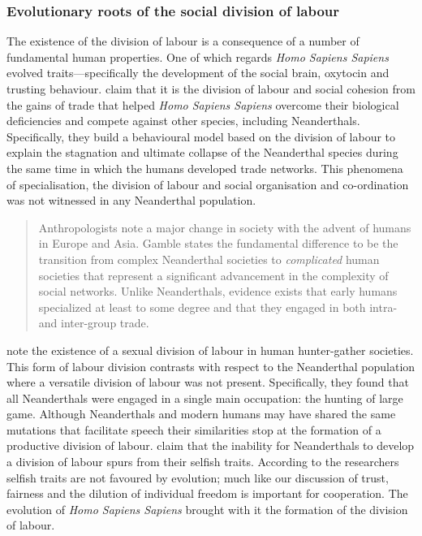 \subsubsection{Evolutionary roots of the social division of labour}

The existence of the division of labour is a consequence of a number of fundamental human properties. One of which regards \emph{Homo Sapiens Sapiens} evolved traits---specifically the development of the social brain, oxytocin and trusting behaviour. \citet{Horan2005} claim that it is the division of labour and social cohesion from the gains of trade that helped \emph{Homo Sapiens Sapiens} overcome their biological deficiencies and compete against other species, including Neanderthals. Specifically, they build a behavioural model based on the division of labour to explain the stagnation and ultimate collapse of the Neanderthal species during the same time in which the humans developed trade networks. This phenomena of specialisation, the division of labour and social organisation and co-ordination was not witnessed in any Neanderthal population.

\begin{quote}
Anthropologists note a major change in society with the advent of humans in Europe and Asia. Gamble states the fundamental difference to be the transition from complex Neanderthal societies to \emph{complicated} human societies that represent a significant advancement in the complexity of social networks. Unlike Neanderthals, evidence exists that early humans specialized at least to some degree and that they engaged in both intra- and inter-group trade.

\begin{flushright}
\citet[p.~5]{Horan2005}
\end{flushright}
\end{quote}

\citet{KuhnSteiner2006} note the existence of a sexual division of labour in human hunter-gather societies. This form of labour division contrasts with respect to the Neanderthal population where a versatile division of labour was not present. Specifically, they found that all Neanderthals were engaged in a single main occupation: the hunting of large game. Although Neanderthals and modern humans may have shared the same mutations that facilitate speech their similarities stop at the formation of a productive division of labour. \citet{AdamiHintze2013} claim that the inability for Neanderthals to develop a division of labour spurs from their selfish traits. According to the researchers selfish traits are not favoured by evolution; much like our discussion of trust, fairness and the dilution of individual freedom is important for cooperation. The evolution of \emph{Homo Sapiens Sapiens} brought with it the formation of the division of labour.


